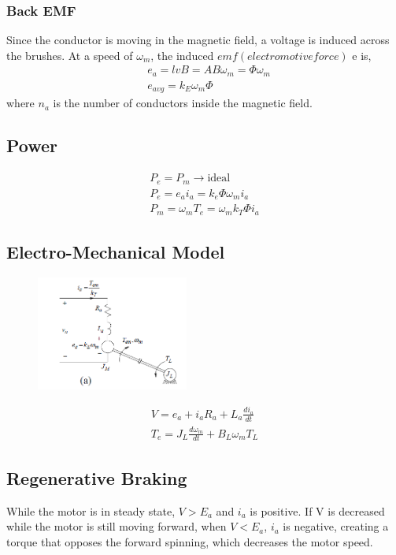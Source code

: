 \documentclass{article}
\begin{document}
    \subsubsection*{Back EMF}
    Since the conductor is moving in the magnetic field, a voltage is induced across the brushes.
    At a speed of $\omega_{m}$, the induced $emf(electromotive force)$ e is,
    \begin{align*}
        &e_{a} = lvB = A B \omega_{m} = \Phi \omega_{m} \\
        &e_{avg} = k_{E}\omega_{m} \Phi
    \end{align*}
    where $n_{a}$ is the number of conductors inside the magnetic field.

    \subsection*{Power}
    \begin{align*}
        P_{e} = P_{m} \rightarrow \text{ideal}\\
        P_{e} = e_{a}i_{a} = k_{e} \Phi \omega_{m} i_{a}\\
        P_{m} = \omega_{m}T_{e} = \omega_{m} k_{T} \Phi i_{a}
    \end{align*}

    \subsection*{Electro-Mechanical Model}
    \begin{figure}[H]
            \centering
            \includegraphics[width=5cm]{figures/elec-mech-model.png}
    \end{figure}
    \begin{align*}
        V = e_{a} + i_{a}R_{a} + L_{a}\frac{di_{a}}{dt}\\
        T_{e} = J_{L}\frac{d\omega_{m}}{dt} + B_{L}\omega_{m} T_{L}
    \end{align*}

    \subsection*{Regenerative Braking}
    While the motor is in steady state, $V>E_{a}$ and $i_{a}$ is positive. If V is decreased while 
    the motor is still moving forward, when $V < E_{a}$, $i_{a}$ is negative, creating a torque that 
    opposes the forward spinning, which decreases the motor speed.
\end{document}
